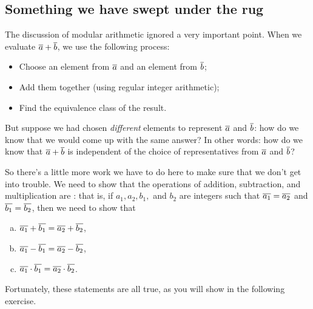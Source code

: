\subsection{Something we have swept under the rug} \label{EquivalenceRelationsWellDefSect}

The discussion of modular arithmetic ignored a very important point. When we evaluate $\overline{a} \mathbin{+} \overline{b}$, we use the following process:
\begin{itemize}
\item
Choose an element from  $\overline{a}$ and an element from $\overline{b}$;
\item
Add them together (using regular integer arithmetic);
\item
Find the equivalence class of the result. 
\end{itemize}

But suppose we had chosen \emph{different} elements to represent $\overline{a}$ and $\overline{b}$: how do we know that we would come up with the same answer? In other words: how do we know that $\overline{a} \mathbin{+} \overline{b}$ is independent of the choice of representatives from $\overline{a}$ and $\overline{b}$?

So there's a little more work we have to do here to make sure that we don't get into trouble. We need to show that  the operations of addition, subtraction, and multiplication are : that is, if $a_1, a_2, b_1,$ and $b_2$ are integers such that  $\overline{a_1} = \overline{a_2}$ and $\overline{b_1} = \overline{b_2}$, then we need to show that
\begin{enumerate}[(a)]
\item $\overline{a_1} \mathbin{+} \overline{b_1} = \overline{a_2} \mathbin{+} \overline{b_2}$,
\item $\overline{a_1} \mathbin{-} \overline{b_1} = \overline{a_2} \mathbin{-} \overline{b_2}$, 
\item $\overline{a_1} \cdot \overline{b_1} = \overline{a_2} \cdot \overline{b_2}$.
\end{enumerate}
Fortunately, these statements are all true, as you will show in the following exercise.

